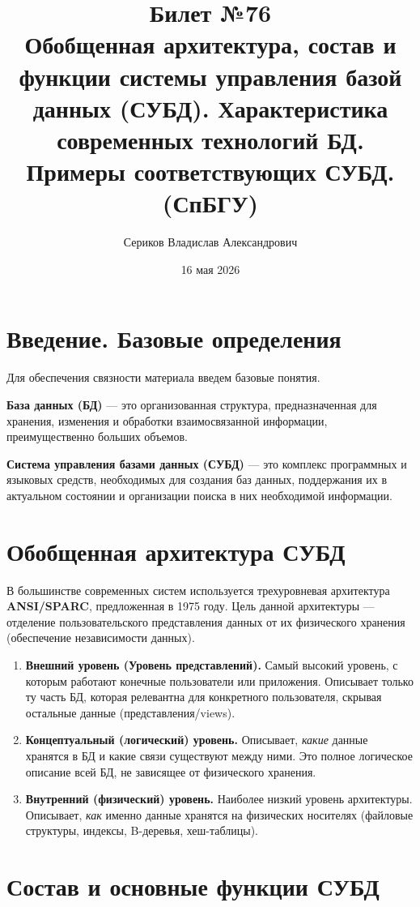 \documentclass[12pt, a4paper]{article}
\title{Билет №76 \\ \small Обобщенная архитектура, состав и функции системы управления базой данных (СУБД). Характеристика современных технологий БД. Примеры соответствующих СУБД. (СпБГУ)}
\author{Сериков Владислав Александрович}
\date{16 мая 2026}
\begin{document}
\maketitle
\tableofcontents
\newpage

\section{Введение. Базовые определения}

Для обеспечения связности материала введем базовые понятия.

\textbf{База данных (БД)} --- это организованная структура, предназначенная для хранения, изменения и обработки взаимосвязанной информации, преимущественно больших объемов.

\textbf{Система управления базами данных (СУБД)} --- это комплекс программных и языковых средств, необходимых для создания баз данных, поддержания их в актуальном состоянии и организации поиска в них необходимой информации.

\section{Обобщенная архитектура СУБД}

В большинстве современных систем используется трехуровневая архитектура \textbf{ANSI/SPARC}, предложенная в 1975 году. Цель данной архитектуры --- отделение пользовательского представления данных от их физического хранения (обеспечение независимости данных).

\begin{enumerate}
    \item \textbf{Внешний уровень (Уровень представлений).} Самый высокий уровень, с которым работают конечные пользователи или приложения. Описывает только ту часть БД, которая релевантна для конкретного пользователя, скрывая остальные данные (представления/views).
    \item \textbf{Концептуальный (логический) уровень.} Описывает, \textit{какие} данные хранятся в БД и какие связи существуют между ними. Это полное логическое описание всей БД, не зависящее от физического хранения.
    \item \textbf{Внутренний (физический) уровень.} Наиболее низкий уровень архитектуры. Описывает, \textit{как} именно данные хранятся на физических носителях (файловые структуры, индексы, B-деревья, хеш-таблицы).
\end{enumerate}

\section{Состав и основные функции СУБД}
\end{document}

